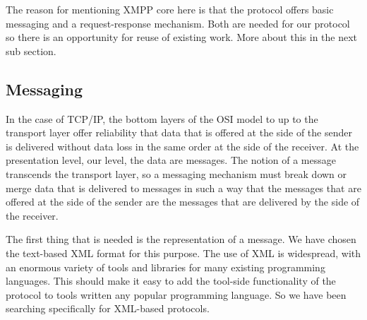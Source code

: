 \documentclass{article}
\begin{document}
   The reason for mentioning XMPP core here is that the protocol offers basic
   messaging and a request-response mechanism. Both are needed for our protocol
   so there is an opportunity for reuse of existing work. More about this in
   the next sub section.
   


  \subsection{Messaging}

   In the case of TCP/IP, the bottom layers of the OSI model to up to the
   transport layer offer reliability that data that is offered at the side of
   the sender is delivered without data loss in the same order at the side of
   the receiver. At the presentation level, our level, the data are messages.
   The notion of a message transcends the transport layer, so a messaging
   mechanism must break down or merge data that is delivered to messages in
   such a way that the messages that are offered at the side of the sender are
   the messages that are delivered by the side of the receiver.
   
   The first thing that is needed is the representation of a message. We have
   chosen the text-based XML format for this purpose. The use of XML is
   widespread, with an enormous variety of tools and libraries for many
   existing programming languages. This should make it easy to add the
   tool-side functionality of the protocol to tools written any popular
   programming language. So we have been searching specifically for XML-based
   protocols. 
   
\end{document}
